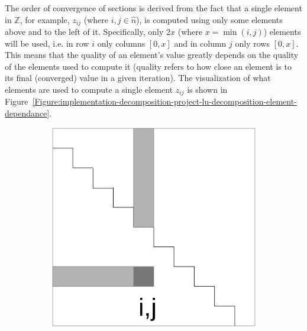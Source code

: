 The order of convergence of sections is derived from the fact that a single element in $ \mathbb{Z} $, for example, $ z_{ij} $ (where $ i,j \in \widehat{n} $), is computed using only some elements above and to the left of it. Specifically, only $ 2x $ (where $ x = \min(i, j) $) elements will be used, i.e. in row $ i $ only columns $ \left[0, x\right] $ and in column $ j $ only rows $ \left[0, x\right] $. This means that the quality of an element's value greatly depends on the quality of the elements used to compute it (quality refers to how close an element is to its final (converged) value in a given iteration). The visualization of what elements are used to compute a single element $ z_{ij} $ is shown in Figure~\ref{Figure:implementation-decomposition-project-lu-decomposition-element-dependance}.

\begin{figure}[ht!]
	\centering
	\begin{subfigure}{.5\textwidth}
		\centering
		\includegraphics[width=.8\textwidth, keepaspectratio]{images/ch2/LU_decomposition_crout_method_visualization_elements_used_simple_lower.png}
		\label{Figure:implementation-decomposition-project-lu-decomposition-element-dependance-lower}
	\end{subfigure}%
	\begin{subfigure}{.5\textwidth}
		\centering

\end{subfigure}
\end{figure}
